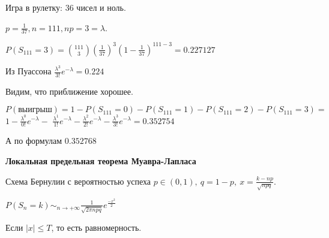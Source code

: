 \begin{example}
    Игра в рулетку: 36 чисел и ноль. 

    $p = \frac{1}{37}, n = 111, np = 3 = \lambda$.

    $P(S_{111} = 3) = \binom{111}{3} (\frac{1}{37})^3 (1 - \frac{1}{37})^{111 - 3} = 0.227127$

    Из Пуассона $\frac{\lambda^3}{3!} e^{-\lambda} = 0.224$

    Видим, что приближение хорошее.

    $P(\text{выигрыш}) = 1 - P(S_{111} = 0) - P(S_{111} = 1) - P(S_{111} = 2) - P(S_{111} = 3) = $
    $1 - \frac{\lambda^0}{0!}e^{-\lambda} -$
    $\frac{\lambda^1}{1!}e^{-\lambda} - \frac{\lambda^2}{2!}e^{-\lambda} - \frac{\lambda^3}{3!}e^{-\lambda} = 0.352754$
    
    А по формулам $0.352768$
\end{example}

\begin{theorem}
    \textbf{Локальная предельная теорема Муавра-Лапласа}

    Схема Бернулии с вероятностью успеха $p \in (0, 1), \ q = 1 - p, \ x = \frac{k - np}{\sqrt{npq}}$.

    $P(S_n = k) \sim_{n \to +\infty} \frac{1}{\sqrt{2\pi n p q}} e^{\frac{-x^2}{2}}$

    Если $|x| \leqslant T$, то есть равномерность.
\end{theorem}

